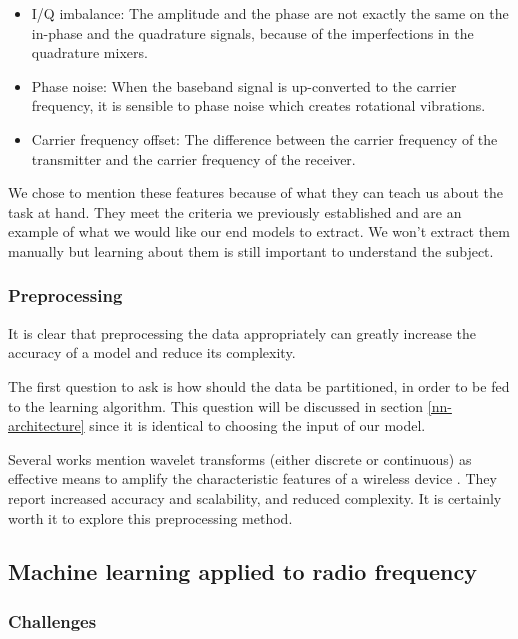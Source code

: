 \begin{itemize}
  \item{I/Q imbalance:} The amplitude and the phase are not exactly the same on the in-phase and the quadrature signals, because of the imperfections in the quadrature mixers.
  \item{Phase noise:} When the baseband signal is up-converted to the carrier frequency, it is sensible to phase noise which creates rotational vibrations.
  \item{Carrier frequency offset:} The difference between the carrier frequency of the transmitter and the carrier frequency of the receiver.
\end{itemize}

We chose to mention these features because of what they can teach us about the task at hand. They meet the criteria we previously established and are an example of what we would like our end models to extract. We won't extract them manually but learning about them is still important to understand the subject.

\subsubsection{Preprocessing}

It is clear that preprocessing the data appropriately can greatly increase the accuracy of a model and reduce its complexity.

The first question to ask is how should the data be partitioned, in order to be fed to the learning algorithm. This question will be discussed in section \ref{nn-architecture} since it is identical to choosing the input of our model.

Several works mention wavelet transforms (either discrete or continuous) as effective means to amplify the characteristic features of a wireless device \cite{xu_device_2015, oyedare_estimating_2019, youssef_machine_2017}. They report increased accuracy and scalability, and reduced complexity. It is certainly worth it to explore this preprocessing method.

\subsection{Machine learning applied to radio frequency}

\subsubsection{Challenges} \label{challenges}


